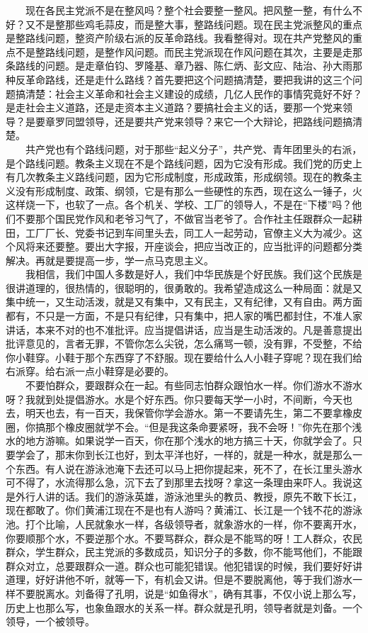 \documentclass[cn,11pt,chinese]{elegantbook}
\begin{document}
　　现在各民主党派不是在整风吗？整个社会要整一整风。把风整一整，有什么不好？又不是整那些鸡毛蒜皮，而是整大事，整路线问题。现在民主党派整风的重点是整路线问题，整资产阶级右派的反革命路线。我看整得对。现在共产党整风的重点不是整路线问题，是整作风问题。而民主党派现在作风问题在其次，主要是走那条路线的问题。是走章伯钧、罗隆基、章乃器、陈仁炳、彭文应、陆治、孙大雨那种反革命路线，还是走什么路线？首先要把这个问题搞清楚，要把我讲的这三个问题搞清楚：社会主义革命和社会主义建设的成绩，几亿人民作的事情究竟好不好？是走社会主义道路，还是走资本主义道路？要搞社会主义的话，要那一个党来领导？是要章罗同盟领导，还是要共产党来领导？来它一个大辩论，把路线问题搞清楚。\\
　　共产党也有个路线问题，对于那些“起义分子”，共产党、青年团里头的右派，是个路线问题。教条主义现在不是个路线问题，因为它没有形成。我们党的历史上有几次教条主义路线问题，因为它形成制度，形成政策，形成纲领。现在的教条主义没有形成制度、政策、纲领，它是有那么一些硬性的东西，现在这么一锤子，火这样烧一下，也软了一点。各个机关、学校、工厂的领导人，不是在“下楼”吗？他们不要那个国民党作风和老爷习气了，不做官当老爷了。合作社主任跟群众一起耕田，工厂厂长、党委书记到车间里头去，同工人一起劳动，官僚主义大为减少。这个风将来还要整。要出大字报，开座谈会，把应当改正的，应当批评的问题都分类解决。再就是要提高一步，学一点马克思主义。\\
　　我相信，我们中国人多数是好人，我们中华民族是个好民族。我们这个民族是很讲道理的，很热情的，很聪明的，很勇敢的。我希望造成这么一种局面：就是又集中统一，又生动活泼，就是又有集中，又有民主，又有纪律，又有自由。两方面都有，不只是一方面，不是只有纪律，只有集中，把人家的嘴巴都封住，不准人家讲话，本来不对的也不准批评。应当提倡讲话，应当是生动活泼的。凡是善意提出批评意见的，言者无罪，不管你怎么尖锐，怎么痛骂一顿，没有罪，不受整，不给你小鞋穿。小鞋于那个东西穿了不舒服。现在要给什么人小鞋子穿呢？现在我们给右派穿。给右派一点小鞋穿是必要的。\\
　　不要怕群众，要跟群众在一起。有些同志怕群众跟怕水一样。你们游水不游水呀？我就到处提倡游水。水是个好东西。你只要每天学一小时，不间断，今天也去，明天也去，有一百天，我保管你学会游水。第一不要请先生，第二不要拿橡皮圈，你搞那个橡皮圈就学不会。“但是我这条命要紧呀，我不会呀！”你先在那个浅水的地方游嘛。如果说学一百天，你在那个浅水的地方搞三十天，你就学会了。只要学会了，那末你到长江也好，到太平洋也好，一样的，就是一种水，就是那么一个东西。有人说在游泳池淹下去还可以马上把你提起来，死不了，在长江里头游水可不得了，水流得那么急，沉下去了到那里去找呀？拿这一条理由来吓人。我说这是外行人讲的话。我们的游泳英雄，游泳池里头的教员、教授，原先不敢下长江，现在都敢了。你们黄浦江现在不是也有人游吗？黄浦江、长江是一个钱不花的游泳池。打个比喻，人民就象水一样，各级领导者，就象游水的一样，你不要离开水，你要顺那个水，不要逆那个水。不要骂群众，群众是不能骂的呀！工人群众，农民群众，学生群众，民主党派的多数成员，知识分子的多数，你不能骂他们，不能跟群众对立，总要跟群众一道。群众也可能犯错误。他犯错误的时候，我们要好好讲道理，好好讲他不听，就等一下，有机会又讲。但是不要脱离他，等于我们游水一样不要脱离水。刘备得了孔明，说是“如鱼得水”，确有其事，不仅小说上那么写，历史上也那么写，也象鱼跟水的关系一样。群众就是孔明，领导者就是刘备。一个领导，一个被领导。\\
\end{document}
